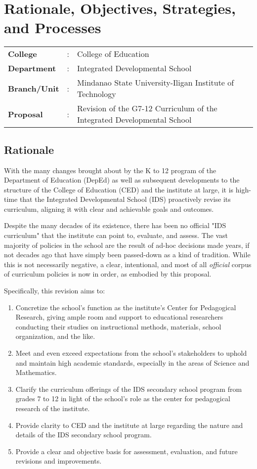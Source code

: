 \section{Rationale, Objectives, Strategies, and Processes}
\begin{tabular}{l c l}
	\textbf{College} 		&	:  &	College of Education\\
	\textbf{Department}	&	:  &	Integrated Developmental School\\
	\textbf{Branch/Unit}&	:  &	Mindanao State University-Iligan Institute of Technology\\
	\textbf{Proposal}		&	:  &	Revision of the G7-12 Curriculum of the Integrated Developmental School\\
\end{tabular}

\subsection{Rationale}
With the many changes brought about by the K to 12 program of the Department of Education (DepEd) as well as subsequent developments to the structure of the College of Education (CED) and the institute at large, it is high-time that the Integrated Developmental School (IDS) proactively revise its curriculum, aligning it with clear and achievable goals and outcomes.

Despite the many decades of its existence, there has been no official "IDS curriculum" that the institute can point to, evaluate, and assess. The vast majority of policies in the school are the result of ad-hoc decisions made years, if not decades ago that have simply been passed-down as a kind of tradition. While this is not necessarily negative, a clear, intentional, and most of all \textit{official} corpus of curriculum policies is now in order, as embodied by this proposal.

Specifically, this revision aims to:
\begin{enumerate}
	\item{Concretize the school's function as the institute's Center for Pedagogical Research, giving ample room and support to educational researchers conducting their studies on instructional methods, materials, school organization, and the like.}
	\item{Meet and even exceed expectations from the school's stakeholders to uphold and maintain high academic standards, especially in the areas of Science and Mathematics.}
	\item{Clarify the curriculum offerings of the IDS secondary school program from grades 7 to 12 in light of the school's role as the center for pedagogical research of the institute.}
	\item{Provide clarity to CED and the institute at large regarding the nature and details of the IDS secondary school program.}
	\item{Provide a clear and objective basis for assessment, evaluation, and future revisions and improvements.}
\end{enumerate}



